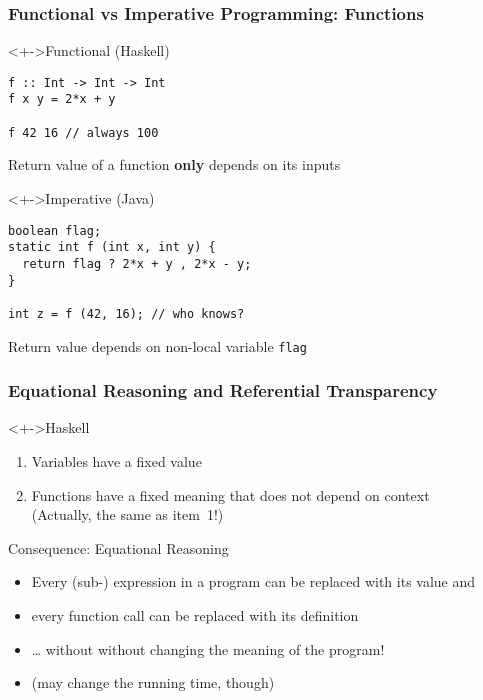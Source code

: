 \documentclass{beamer}
\begin{document}
\begin{frame}[fragile]
  \frametitle{Functional vs Imperative Programming: Functions}
  \begin{block}<+->{Functional (Haskell)}
\begin{verbatim}
f :: Int -> Int -> Int
f x y = 2*x + y

f 42 16 // always 100
\end{verbatim}
    Return value of a function \textbf{only} depends on its inputs
  \end{block}
  \begin{block}<+->{Imperative (Java)}
\begin{verbatim}
boolean flag;
static int f (int x, int y) {
  return flag ? 2*x + y , 2*x - y;
}

int z = f (42, 16); // who knows?
\end{verbatim}
    Return value  depends on non-local variable \texttt{flag}
  \end{block}
\end{frame}

\begin{frame}
  \frametitle{Equational Reasoning and Referential Transparency}
  \begin{block}<+->{Haskell}
    \begin{enumerate}
    \item Variables have a fixed value
    \item Functions have a fixed meaning that does not depend on
      context\\
      (Actually, the same as item~1!)
    \end{enumerate}
  \end{block}
  \begin{block}{Consequence: Equational Reasoning}
    \begin{itemize}
    \item Every (sub-) expression in a program can be replaced with
      its value and
    \item every function call can be replaced with its definition
    \item \dots{} without  without changing the meaning of the
      program!
    \item (may change the running time, though)
    \end{itemize}
  \end{block}
\end{frame}
\end{document}
